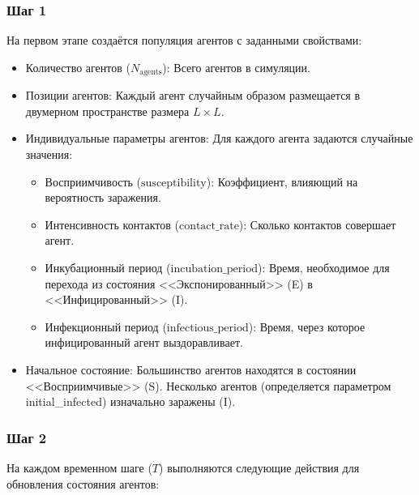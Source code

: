 \documentclass[a4paper, 14pt]{extreport}
\begin{document}
	\subsubsection*{Шаг 1}
	
	На первом этапе создаётся популяция агентов с заданными свойствами:
	
	\begin{itemize}
		\item {Количество агентов ($N_{\text{agents}}$)}: Всего агентов в симуляции.
		\item {Позиции агентов}: Каждый агент случайным образом размещается в двумерном пространстве размера $L \times L$.
		\item {Индивидуальные параметры агентов}: Для каждого агента задаются случайные значения:
		\begin{itemize}
			\item {Восприимчивость ($\text{susceptibility}$)}: Коэффициент, влияющий на вероятность заражения.
			\item {Интенсивность контактов ($\text{contact\_rate}$)}: Сколько контактов совершает агент.
			\item {Инкубационный период ($\text{incubation\_period}$)}: Время, необходимое для перехода из состояния <<Экспонированный>> (E) в <<Инфицированный>> (I).
			\item {Инфекционный период ($\text{infectious\_period}$)}: Время, через которое инфицированный агент выздоравливает.
		\end{itemize}
		\item {Начальное состояние}: Большинство агентов находятся в состоянии <<Восприимчивые>> (S). Несколько агентов (определяется параметром\\ initial\_infected) изначально заражены (I).
	\end{itemize}
	
	\subsubsection*{Шаг 2}
	
	На каждом временном шаге ($T$) выполняются следующие действия для обновления состояния агентов:
	
\end{document}
